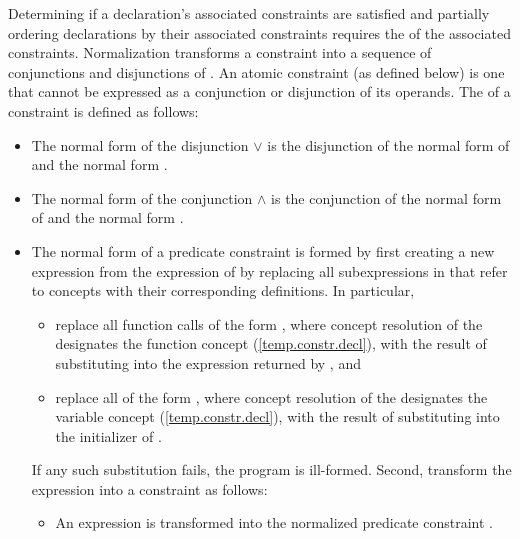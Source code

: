 \pnum
Determining if a declaration's associated constraints are satisfied
and partially ordering declarations by their associated constraints
requires the  of the associated constraints. 
% 
Normalization transforms a constraint into a
sequence of conjunctions and disjunctions of .
% 
An atomic constraint (as defined below) is one that cannot be expressed
as a conjunction or disjunction of its operands.
% 
The  of a constraint is defined as follows:
% 
\begin{itemize}
\item The normal form of the disjunction  $\lor$  is the 
disjunction of the normal form of  and the normal form .

\item The normal form of the conjunction  $\land$  is the 
conjunction of the normal form of  and the normal form .

\item The normal form of a predicate constraint  is formed by
first creating a new expression  from the expression of  by 
replacing all subexpressions in  that refer to concepts with their 
corresponding definitions. In particular,
% 
\begin{itemize}

\item replace all function calls of the form 
, where concept resolution of the
  designates 
the function concept  (\ref{temp.constr.decl}),
with the result of substituting  into the 
expression returned by , and

\item replace all  of the form 
, where concept resolution of the 
  designates
the variable concept  (\ref{temp.constr.decl}),
with the result of substituting  
into the initializer of .
\end{itemize}
% 
If any such substitution fails, the program is ill-formed.
% 
Second, transform the expression  into a constraint as follows:
\begin{itemize}
\item An expression  is transformed into the normalized predicate 
constraint .


\end{itemize}
\end{itemize}
